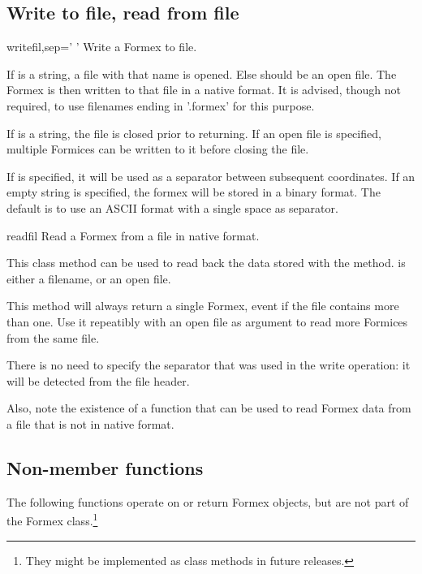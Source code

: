 \subsection{Write to file, read from file}


\begin{methoddesc}{write}{fil,sep=' '}
Write a Formex to file.

If  is a string, a file with that name is opened. Else  should
be an open file.
The Formex is then written to that file in a native format. It is advised, though not required, to use filenames ending in '.formex' for this purpose.

If  is a string, the file is closed prior to returning. If an open file is specified, multiple Formices can be written to it before closing the file.

If  is specified, it will be used as a separator between subsequent coordinates. If an empty string is specified, the formex will be stored in a binary format. The default is to use an ASCII format with a single space as separator.
\end{methoddesc}


\begin{methoddesc}{read}{fil}
Read a Formex from a file in native format. 

This class method can be used to read back the data stored with the  method.  is either a filename, or an open file.
 
This method will always return a single Formex, event if the file contains more than one. Use it repeatibly with an open file as argument to read more Formices from the same file.

There is no need to specify the separator that was used in the write operation: it will be detected from the file header.

Also, note the existence of a  function that can be used to read Formex data from a file that is not in native format. 

\classmethod
\end{methoddesc}


\subsection{Non-member functions}
The following functions operate on or return Formex objects, but are not part of the Formex class.\footnote{They might be implemented as class methods in future releases.}

